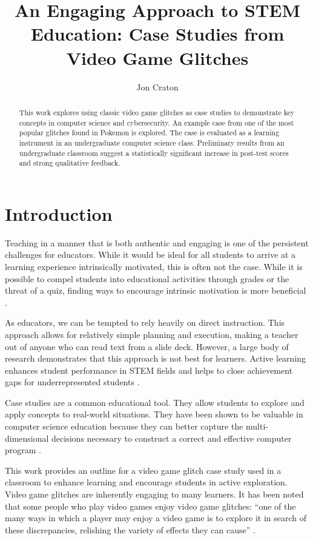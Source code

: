 \documentclass[letterpaper]{article}
\title{An Engaging Approach to STEM Education: Case Studies from Video Game Glitches}
\author[1]{Jon Craton}
\affil[1]{Anderson University, Anderson, IN}
\date{} %
\begin{document}
\maketitle

\begin{abstract}
This work explores using classic video game glitches as case studies to demonstrate key concepts in computer science and cybersecurity. An example case from one of the most popular glitches found in Pokemon is explored. The case is evaluated as a learning instrument in an undergraduate computer science class. Preliminary results from an undergraduate classroom suggest a statistically significant increase in post-test scores and strong qualitative feedback.
\end{abstract}

\section{Introduction}
Teaching in a manner that is both authentic and engaging is one of the persistent challenges for educators. While it would be ideal for all students to arrive at a learning experience intrinsically motivated, this is often not the case. While it is possible to compel students into educational activities through grades or the threat of a quiz, finding ways to encourage intrinsic motivation is more beneficial \cite{deci2013intrinsic}.

As educators, we can be tempted to rely heavily on direct instruction. This approach allows for relatively simple planning and execution, making a teacher out of anyone who can read text from a slide deck. However, a large body of research demonstrates that this approach is not best for learners. Active learning enhances student performance in STEM fields \cite{freeman2014active} and helps to close achievement gaps for underrepresented students \cite{theobald2020active}.

Case studies are a common educational tool. They allow students to explore and apply concepts to real-world situations. They have been shown to be valuable in computer science education because they can better capture the multi-dimensional decisions necessary to construct a correct and effective computer program \cite{linn1992case}.

This work provides an outline for a video game glitch case study used in a classroom to enhance learning and encourage students in active exploration. Video game glitches are inherently engaging to many learners. It has been noted that some people who play video games enjoy video game glitches: ``one of the many ways in which a player may enjoy a video game is to explore it in search of these discrepancies, relishing the variety of effects they can cause'' \cite{bainbridge2007creative}.
\end{document}
